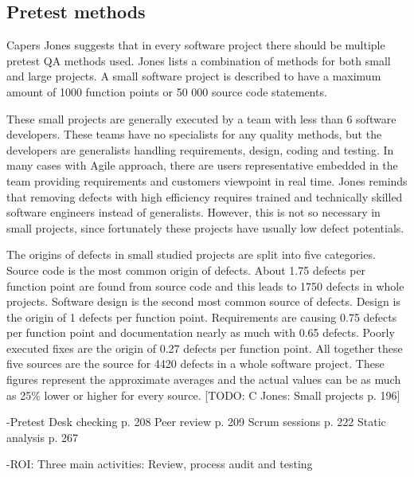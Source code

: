  \subsection{Pretest methods}

Capers Jones suggests that in every software project there should be multiple pretest QA methods used. Jones lists a combination of methods for both small and large projects. A small software project is described to have a maximum amount of 1000 function points or 50 000 source code statements. 

These small projects are generally executed by a team with less than 6 software developers. These teams have no specialists for any quality methods, but the developers are generalists handling requirements, design, coding and testing. In many cases with Agile approach, there are users representative embedded in the team providing requirements and customers viewpoint in real time. Jones reminds that removing defects with high efficiency requires trained and technically skilled software engineers instead of generalists. However, this is not so necessary in small projects, since fortunately these projects have usually low defect potentials.

The origins of defects in small studied projects are split into five categories. Source code is the most common origin of defects. About 1.75 defects per function point are found from source code and this leads to 1750 defects in whole projects. Software design is the second most common source of defects. Design is the origin of 1 defects per function point. Requirements are causing 0.75 defects per function point and documentation nearly as much with 0.65 defects. Poorly executed fixes are the origin of 0.27 defects per function point. All together these five sources are the source for 4420 defects in a whole software project. These figures represent the approximate averages and the actual values can be as much as 25\% lower or higher for every source. [TODO: C Jones: Small projects p. 196]





-Pretest
Desk checking p. 208
Peer review p. 209
Scrum sessions p. 222
Static analysis p. 267

-ROI: Three main activities: Review, process audit and testing
